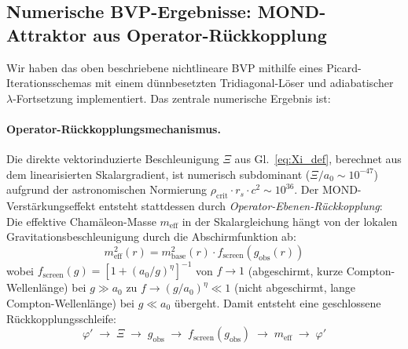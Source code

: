 \documentclass[aps,prd,twocolumn,superscriptaddress,nofootinbib]{revtex4-2}
\begin{document}
\subsection{Numerische BVP-Ergebnisse: MOND-Attraktor aus Operator-R\"uckkopplung}
\label{sec:bvp_results}

Wir haben das oben beschriebene nichtlineare BVP mithilfe eines Picard-Iterationsschemas mit einem d\"unnbesetzten Tridiagonal-L\"oser und adiabatischer $\lambda$-Fortsetzung implementiert. Das zentrale numerische Ergebnis ist:

\paragraph{Operator-R\"uckkopplungsmechanismus.}
Die direkte vektorinduzierte Beschleunigung $\Xi$ aus Gl.~\eqref{eq:Xi_def}, berechnet aus dem linearisierten Skalargradient, ist numerisch subdominant ($\Xi/a_0 \sim 10^{-47}$) aufgrund der astronomischen Normierung $\rho_{\mathrm{crit}} \cdot r_s \cdot c^2 \sim 10^{36}$. Der MOND-Verst\"arkungseffekt entsteht stattdessen durch \textit{Operator-Ebenen-R\"uckkopplung}: Die effektive Cham\"aleon-Masse $m_{\mathrm{eff}}$ in der Skalargleichung h\"angt von der lokalen Gravitationsbeschleunigung durch die Abschirmfunktion ab:
\begin{equation}
m_{\mathrm{eff}}^2(r) = m_{\mathrm{base}}^2(r) \cdot f_{\mathrm{screen}}\!\left(g_{\mathrm{obs}}(r)\right)
\label{eq:m_eff_feedback}
\end{equation}
wobei $f_{\mathrm{screen}}(g) = [1 + (a_0/g)^\eta]^{-1}$ von $f \to 1$ (abgeschirmt, kurze Compton-Wellenl\"ange) bei $g \gg a_0$ zu $f \to (g/a_0)^\eta \ll 1$ (nicht abgeschirmt, lange Compton-Wellenl\"ange) bei $g \ll a_0$ \"ubergeht. Damit entsteht eine geschlossene R\"uckkopplungsschleife:
\begin{equation}
\varphi' \;\to\; \Xi \;\to\; g_{\mathrm{obs}} \;\to\; f_{\mathrm{screen}}(g_{\mathrm{obs}}) \;\to\; m_{\mathrm{eff}} \;\to\; \varphi'
\end{equation}
\end{document}
